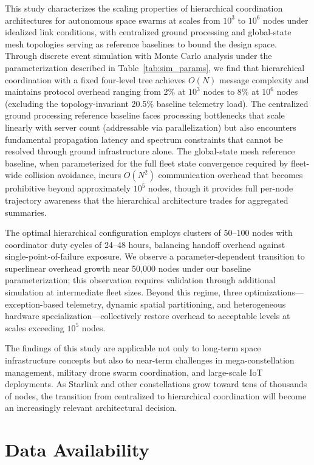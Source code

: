 \documentclass[journal]{IEEEtran}
\begin{document}
This study characterizes the scaling properties of hierarchical coordination architectures for autonomous space swarms at scales from $10^3$ to $10^6$ nodes under idealized link conditions, with centralized ground processing and global-state mesh topologies serving as reference baselines to bound the design space. Through discrete event simulation with Monte Carlo analysis under the parameterization described in Table~\ref{tab:sim_params}, we find that hierarchical coordination with a fixed four-level tree achieves $O(N)$ message complexity and maintains protocol overhead ranging from 2\% at $10^3$ nodes to 8\% at $10^6$ nodes (excluding the topology-invariant 20.5\% baseline telemetry load). The centralized ground processing reference baseline faces processing bottlenecks that scale linearly with server count (addressable via parallelization) but also encounters fundamental propagation latency and spectrum constraints that cannot be resolved through ground infrastructure alone. The global-state mesh reference baseline, when parameterized for the full fleet state convergence required by fleet-wide collision avoidance, incurs $O(N^2)$ communication overhead that becomes prohibitive beyond approximately $10^5$ nodes, though it provides full per-node trajectory awareness that the hierarchical architecture trades for aggregated summaries.

The optimal hierarchical configuration employs clusters of 50--100 nodes with coordinator duty cycles of 24--48 hours, balancing handoff overhead against single-point-of-failure exposure. We observe a parameter-dependent transition to superlinear overhead growth near 50{,}000 nodes under our baseline parameterization; this observation requires validation through additional simulation at intermediate fleet sizes. Beyond this regime, three optimizations---exception-based telemetry, dynamic spatial partitioning, and heterogeneous hardware specialization---collectively restore overhead to acceptable levels at scales exceeding $10^5$ nodes.

The findings of this study are applicable not only to long-term space infrastructure concepts but also to near-term challenges in mega-constellation management, military drone swarm coordination, and large-scale IoT deployments. As Starlink and other constellations grow toward tens of thousands of nodes, the transition from centralized to hierarchical coordination will become an increasingly relevant architectural decision.

\section*{Data Availability}
\end{document}
